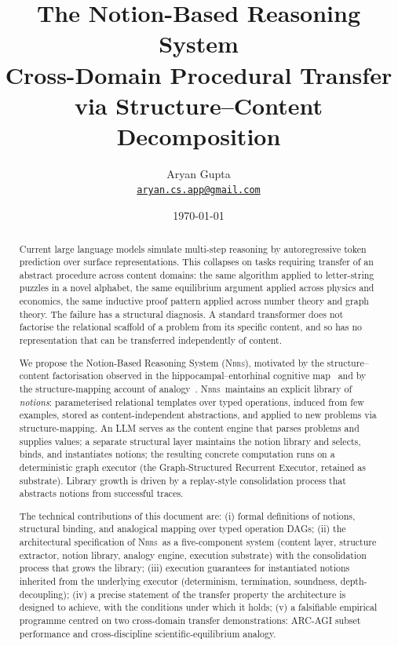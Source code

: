 \documentclass[11pt,a4paper]{article}
\title{\bfseries The Notion-Based Reasoning System\\[0.3em]
\large Cross-Domain Procedural Transfer via Structure--Content Decomposition}
\author{Aryan Gupta\\[2pt]\href{mailto:aryan.cs.app@gmail.com}{\texttt{aryan.cs.app@gmail.com}}}
\date{\today}
\theoremstyle{plain}
\theoremstyle{definition}
\theoremstyle{remark}
\newcommand{\NBRS}{\textsc{Nbrs}}
\begin{document}
\maketitle

\begin{abstract}
\noindent Current large language models simulate multi-step reasoning by autoregressive token prediction over surface representations. This collapses on tasks requiring transfer of an abstract procedure across content domains: the same algorithm applied to letter-string puzzles in a novel alphabet, the same equilibrium argument applied across physics and economics, the same inductive proof pattern applied across number theory and graph theory. The failure has a structural diagnosis. A standard transformer does not factorise the relational scaffold of a problem from its specific content, and so has no representation that can be transferred independently of content.

We propose the Notion-Based Reasoning System (\NBRS), motivated by the structure--content factorisation observed in the hippocampal--entorhinal cognitive map~\cite{whittington2020tem, behrens2018cognitive, constantinescu2016conceptual} and by the structure-mapping account of analogy~\cite{gentner1983structure, falkenhainer1989sme}. \NBRS\ maintains an explicit library of \emph{notions}: parameterised relational templates over typed operations, induced from few examples, stored as content-independent abstractions, and applied to new problems via structure-mapping. An LLM serves as the content engine that parses problems and supplies values; a separate structural layer maintains the notion library and selects, binds, and instantiates notions; the resulting concrete computation runs on a deterministic graph executor (the Graph-Structured Recurrent Executor, retained as substrate). Library growth is driven by a replay-style consolidation process that abstracts notions from successful traces.

The technical contributions of this document are: (i) formal definitions of notions, structural binding, and analogical mapping over typed operation DAGs; (ii) the architectural specification of \NBRS\ as a five-component system (content layer, structure extractor, notion library, analogy engine, execution substrate) with the consolidation process that grows the library; (iii) execution guarantees for instantiated notions inherited from the underlying executor (determinism, termination, soundness, depth-decoupling); (iv) a precise statement of the transfer property the architecture is designed to achieve, with the conditions under which it holds; (v) a falsifiable empirical programme centred on two cross-domain transfer demonstrations: ARC-AGI subset performance and cross-discipline scientific-equilibrium analogy.
\end{abstract}
\end{document}
